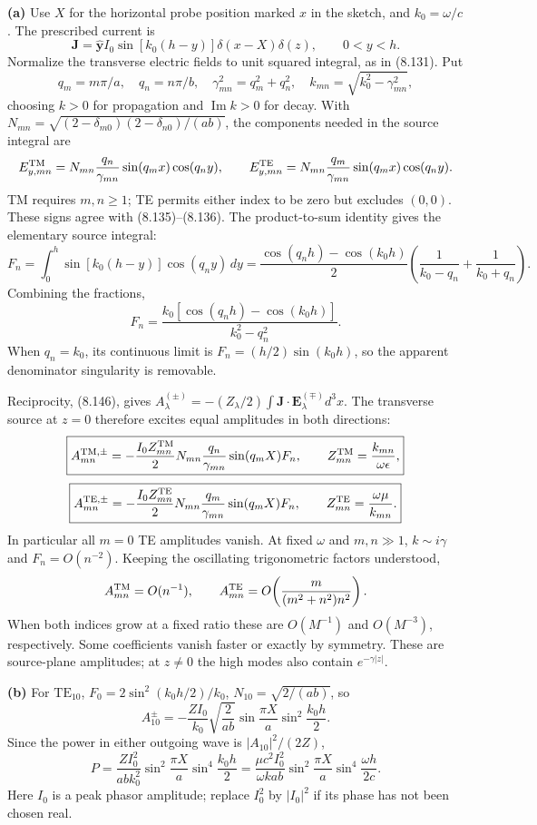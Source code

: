 \medskip\noindent\textbf{(a)} Use $X$ for the horizontal probe position marked $x$ in the sketch,
and $k_0=\omega/c$.  The prescribed current is
\[
\mathbf J=\widehat{\mathbf y} I_0\sin[k_0(h-y)]
 \delta(x-X)\delta(z),\qquad 0<y<h.
\]
Normalize the transverse electric fields to unit squared integral,
as in (8.131).  Put
\[
q_m=m\pi/a,\quad q_n=n\pi/b,\quad
\gamma_{mn}^2=q_m^2+q_n^2,\quad
k_{mn}=\sqrt{k_0^2-\gamma_{mn}^2},
\]
choosing $k>0$ for propagation and $\operatorname{Im}k>0$ for decay.
With $N_{mn}=\sqrt{(2-\delta_{m0})(2-\delta_{n0})/(ab)}$,
the components needed in the source integral are
\[
E_{y,mn}^{\rm TM}=N_{mn}\frac{q_n}{\gamma_{mn}}
 \sin(q_mx)\cos(q_ny),\qquad
E_{y,mn}^{\rm TE}=N_{mn}\frac{q_m}{\gamma_{mn}}
 \sin(q_mx)\cos(q_ny).
\]
TM requires $m,n\geq1$; TE permits either index to be zero but
excludes $(0,0)$.  These signs agree with (8.135)--(8.136).
The product-to-sum identity gives the elementary source integral:
\[
F_n=\int_0^h\sin[k_0(h-y)]\cos(q_ny)\,dy
 =\frac{\cos(q_nh)-\cos(k_0h)}2
 \left(\frac1{k_0-q_n}+\frac1{k_0+q_n}\right).
\]
Combining the fractions,
\[
F_n=\frac{k_0[\cos(q_nh)-\cos(k_0h)]}{k_0^2-q_n^2}.
\]
When $q_n=k_0$, its continuous limit is
$F_n=(h/2)\sin(k_0h)$, so the apparent denominator singularity is
removable.

Reciprocity, (8.146), gives
$A_\lambda^{(\pm)}=-(Z_\lambda/2)\int\mathbf J\cdot
\mathbf E_\lambda^{(\mp)}d^3x$.
The transverse source at $z=0$ therefore excites equal amplitudes
in both directions:
\[
\boxed{A_{mn}^{{\rm TM},\pm}
=-\frac{I_0Z_{mn}^{\rm TM}}2 N_{mn}\frac{q_n}{\gamma_{mn}}
 \sin(q_mX)F_n,\qquad Z_{mn}^{\rm TM}=\frac{k_{mn}}{\omega\epsilon},}
\]
\[
\boxed{A_{mn}^{{\rm TE},\pm}
=-\frac{I_0Z_{mn}^{\rm TE}}2 N_{mn}\frac{q_m}{\gamma_{mn}}
 \sin(q_mX)F_n,\qquad Z_{mn}^{\rm TE}=\frac{\omega\mu}{k_{mn}}.}
\]
In particular all $m=0$ TE amplitudes vanish.  At fixed $\omega$
and $m,n\gg1$, $k\sim i\gamma$ and $F_n=O(n^{-2})$.
Keeping the oscillating trigonometric factors understood,
\[
A^{\rm TM}_{mn}=O(n^{-1}),\qquad
A^{\rm TE}_{mn}=O\!\left(\frac{m}{(m^2+n^2)n^2}\right).
\]
When both indices grow at a fixed ratio these are $O(M^{-1})$
and $O(M^{-3})$, respectively.  Some coefficients vanish faster
or exactly by symmetry.  These are source-plane amplitudes; at
$z\ne0$ the high modes also contain $e^{-\gamma|z|}$.

\medskip\noindent\textbf{(b)} For $\mathrm{TE}_{10}$,
$F_0=2\sin^2(k_0h/2)/k_0$, $N_{10}=\sqrt{2/(ab)}$, so
\[
A_{10}^{\pm}=-\frac{ZI_0}{k_0}\sqrt{\frac2{ab}}
 \sin\frac{\pi X}{a}\sin^2\frac{k_0h}{2}.
\]
Since the power in either outgoing wave is $|A_{10}|^2/(2Z)$,
\[
\boxed{P=\frac{ZI_0^2}{abk_0^2}
 \sin^2\frac{\pi X}{a}\sin^4\frac{k_0h}{2}
=\frac{\mu c^2I_0^2}{\omega kab}
 \sin^2\frac{\pi X}{a}\sin^4\frac{\omega h}{2c}.}
\]
Here $I_0$ is a peak phasor amplitude; replace $I_0^2$ by
$|I_0|^2$ if its phase has not been chosen real.

